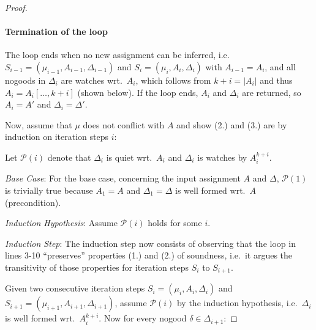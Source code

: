 \documentclass{vutinfth} %
\theoremstyle{example}
\theoremstyle{definition}
\theoremstyle{theorem}
\theoremstyle{lemma}
\theoremstyle{corollary}
\newcommand{\ass}{A}
\newcommand{\fabef}{\ass_{i}}
\newcommand{\abef}{\fabef^{k + i}}
\newcommand{\dbef}{\Delta_{i}}
\newcommand{\daf}{\Delta_{i+1}}
\newcommand{\welf}{well formed\xspace}
\newcommand{\upinv}{quiet\xspace}
\newcommand{\lowinv}{watches\xspace}
\newcommand{\sgl}{\mu}
\begin{document}
\begin{proof}
\paragraph{Termination of the loop} The loop ends when no new assignment can be inferred, i.e.~$S_{i-1} = (\sgl_{i-1}, \ass_{i-1}, \Delta_{i-1})$ and $S_i = (\sgl_i, \ass_i, \Delta_i)$ with $\ass_{i-1} = \ass_i$, and all nogoods in $\Delta_i$ are \lowinv wrt.~$A_i$, which follows from $k + i = |\ass_i|$ and thus $\ass_i = \ass_i[\ldots, k+i]$ (shown below).
If the loop ends, $\ass_i$ and $\Delta_i$ are returned, so $\ass_i = \ass'$ and $\Delta_i = \Delta'$.

Now, assume that $\sgl$ does not conflict with $\ass$ and show (2.) and (3.) are by induction on iteration steps $i$:

Let $\mathcal{P}(i)$ denote that $\dbef$ is \upinv wrt.~$\ass_i$ and $\dbef$ is \lowinv by $\abef$.

\emph{Base Case}: For the base case, concerning the input assignment $\ass$ and $\Delta$, $\mathcal{P}(1)$ is trivially true because $\ass_1 = \ass$ and $\Delta_1 = \Delta$ is \welf wrt.~$\ass$ (precondition).

\emph{Induction Hypothesis}: Assume $\mathcal{P}(i)$ holds for some $i$.

\emph{Induction Step}: The induction step now consists of observing that the loop in lines 3-10 \enquote{preserves} properties (1.) and (2.) of soundness, i.e.~it argues the transitivity of those properties for iteration steps $S_{i}$ to $S_{i+1}$.


Given two consecutive iteration steps $S_{i} = (\sgl_{i}, \ass_{i}, \Delta_{i})$ and $S_{i+1} = (\sgl_{i+1}, \ass_{i+1}, \Delta_{i+1})$, assume $\mathcal{P}(i)$ by the induction hypothesis, i.e.~$\dbef$ is \welf wrt.~$\abef$. Now for every nogood $\delta \in \daf$:


\end{proof}
\end{document}
